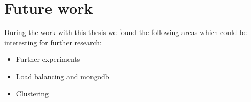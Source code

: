 \section{Future work}
\label{sec:futWork}
During the work with this thesis we found the following areas which could be interesting for further research:

\begin{itemize}
	\item Further experiments
	\item Load balancing and mongodb
	\item Clustering
\end{itemize}
